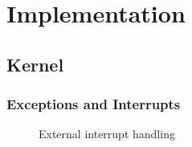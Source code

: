 \chapter{Implementation}




\section{Kernel}




\subsection{Exceptions and Interrupts}\label{subsec:excp-and-ints}
\begin{figure}[h]
	\centering
	
	\caption{External interrupt handling}
	\label{fig:external-interrupt}
\end{figure}





